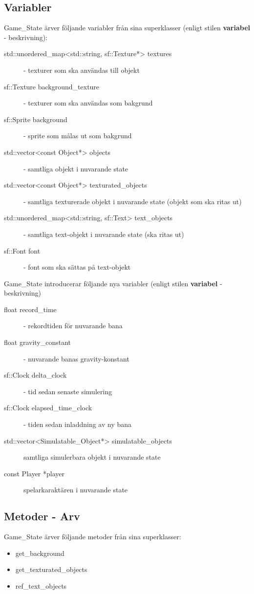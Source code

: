 \documentclass{TDP003mall}
\begin{document}
\subsection{Variabler}
Game\_State ärver följande variabler från sina superklasser (enligt stilen \textbf{variabel} - beskrivning):
\begin{description}
\item[std::unordered\_map<std::string, sf::Texture*> textures] - texturer som ska användas till objekt
\item[sf::Texture background_texture] - texturer som ska användas som bakgrund
\item[sf::Sprite background] - sprite som målas ut som bakgrund
\item[std::vector<const Object*> objects] - samtliga objekt i nuvarande state
\item[std::vector<const Object*> texturated\_objects] - samtliga texturerade objekt i nuvarande state (objekt som ska ritas ut)
\item[std::unordered_map<std::string, sf::Text> text\_objects] - samtliga text-objekt i nuvarande state (ska ritas ut)
\item[sf::Font font] - font som ska sättas på text-objekt
\end{description}
Game\_State introducerar följande nya variabler (enligt stilen \textbf{variabel} - beskrivning)
\begin{description}
\item[float record\_time] - rekordtiden för nuvarande bana
\item[float gravity\_constant] - nuvarande banas gravity-konstant
\item[sf::Clock delta\_clock] - tid sedan senaste simulering
\item[sf::Clock elapsed\_time\_clock] - tiden sedan inladdning av ny bana
\item[std::vector<Simulatable\_Object*> simulatable\_objects] samtliga simulerbara objekt i nuvarande state
\item[const Player *player] spelarkaraktären i nuvarande state
\end{description}

\subsection{Metoder - Arv}
Game\_State ärver följande metoder från sina superklasser:
\begin{itemize}
\item get\_background
\item get\_texturated\_objects
\item ref\_text\_objects
\end{itemize}
\end{document}
